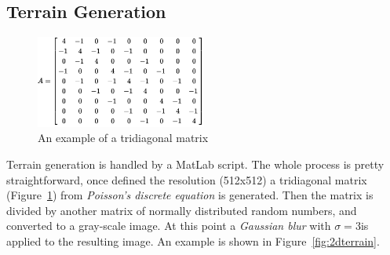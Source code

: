 \documentclass[]{usiinfbachelorproject}
\begin{document}
\subsection{Terrain Generation}
\begin{figure} [h]
\centering
\includegraphics[width=0.5\textwidth]{poisson}
    \caption{An example of a tridiagonal matrix}
\label{fig:poisson}
\end{figure}
\noindent
Terrain generation is handled by a MatLab script. The whole process is pretty straightforward, once defined the resolution (512x512) a tridiagonal matrix (Figure~\ref{fig:poisson}) from \textit{Poisson's
discrete equation} is generated. Then the matrix is divided by another matrix of normally distributed random numbers, and converted to a gray-scale image. At this point a \textit{Gaussian blur} with $\sigma = 3
$is applied to the resulting image. An example is shown in Figure~\ref{fig:2dterrain}.
\end{document}
